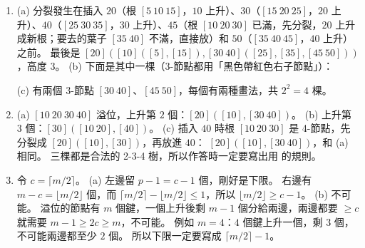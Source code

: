 \begin{enumerate}
\item (a) 分裂發生在插入 $20$（根 $[5\ 10\ 15]$，$10$ 上升）、$30$（$[15\ 20\ 25]$，$20$
上升）、$40$（$[25\ 30\ 35]$，$30$ 上升）、$45$（根 $[10\ 20\ 30]$ 已滿，先分裂，$20$ 上升成新根；要去的葉子 $[35\ 40]$ 不滿，直接放）和 $50$（$[35\ 40\ 45]$，$40$
上升）之前。 最後是 $[20]([10]([5],\allowbreak[15]),[30\ 40]([25],\allowbreak[35],\allowbreak[45\ 50]))$，高度 $3$。
(b) 下面是其中一棵（3-節點都用「黑色帶紅色右子節點」）：
\begin{center}
\end{center}
(c) 有兩個 3-節點 $[30\ 40]$、$[45\ 50]$，每個有兩種畫法，共 $2^2 = 4$ 棵。

\item (a) $[10\ 20\ 30\ 40]$ 溢位，上升第 $2$ 個：$[20]([10],\allowbreak[30\ 40])$。
(b) 上升第 $3$ 個：$[30]([10\ 20],\allowbreak[40])$。
(c) 插入 $40$ 時根 $[10\ 20\ 30]$ 是 4-節點，先分裂成 $[20]([10],\allowbreak[30])$，再放進 $40$：
$[20]([10],\allowbreak[30\ 40])$，和 (a) 相同。 三棵都是合法的 2-3-4 樹，所以作答時一定要寫出用
的規則。

\item 令 $c = \lceil m/2 \rceil$。
(a) 左邊留 $p - 1 = c - 1$ 個，剛好是下限。 右邊有 $m - c = \lfloor m/2 \rfloor$ 個，而
$\lceil m/2 \rceil - \lfloor m/2 \rfloor \le 1$，所以 $\lfloor m/2 \rfloor \ge c - 1$。
(b) 不可能。 溢位的節點有 $m$ 個鍵，一個上升後剩 $m - 1$ 個分給兩邊，兩邊都要
$\ge c$ 就需要 $m - 1 \ge 2c \ge m$，不可能。 例如 $m = 4$：$4$ 個鍵上升一個，剩 $3$
個，不可能兩邊都至少 $2$ 個。 所以下限一定要寫成 $\lceil m/2 \rceil - 1$。


\end{enumerate}
